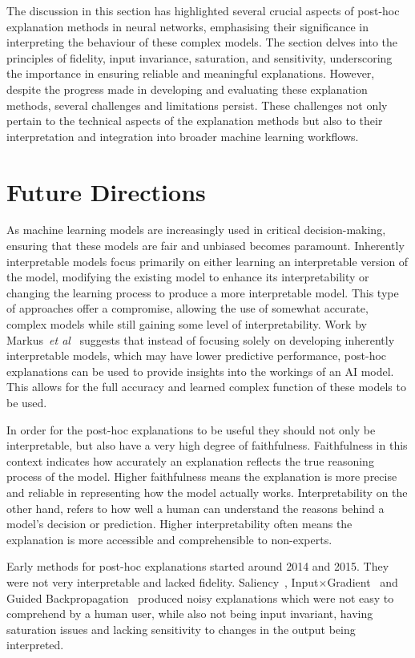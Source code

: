 The discussion in this section has highlighted several crucial aspects of post-hoc explanation methods in neural networks, emphasising their significance in interpreting the behaviour of these complex models. The section delves into the principles of fidelity, input invariance, saturation, and sensitivity, underscoring the importance in ensuring reliable and meaningful explanations. However, despite the progress made in developing and evaluating these explanation methods, several challenges and limitations persist. These challenges not only pertain to the technical aspects of the explanation methods but also to their interpretation and integration into broader machine learning workflows.

\section{Future Directions}

As machine learning models are increasingly used in critical decision-making, ensuring that these models are fair and unbiased becomes paramount. Inherently interpretable models focus primarily on either learning an interpretable version of the model, modifying the existing model to enhance its interpretability or changing the learning process to produce a more interpretable model. This type of approaches offer a compromise, allowing the use of somewhat accurate, complex models while still gaining some level of interpretability. Work by Markus~\textit{et al}~\cite{MarkusKR21} suggests that instead of focusing solely on developing inherently interpretable models, which may have lower predictive performance, post-hoc explanations can be used to provide insights into the workings of an AI model. This allows for the full accuracy and learned complex function of these models to be used.


In order for the post-hoc explanations to be useful they should not only be interpretable, but also have a very high degree of faithfulness. Faithfulness in this context indicates how accurately an explanation reflects the true reasoning process of the model. Higher faithfulness means the explanation is more precise and reliable in representing how the model actually works. Interpretability on the other hand, refers to how well a human can understand the reasons behind a model's decision or prediction. Higher interpretability often means the explanation is more accessible and comprehensible to non-experts. 


Early methods for post-hoc explanations started around 2014 and 2015. They were not very interpretable and lacked fidelity. Saliency~\cite{SimonyanVZ13}, Input$\times$Gradient~\cite{SimonyanVZ13} and Guided Backpropagation~\cite{SpringenbergDBR14} produced noisy explanations which were not easy to comprehend by a human user, while also not being input invariant, having saturation issues and lacking sensitivity to changes in the output being interpreted. 


